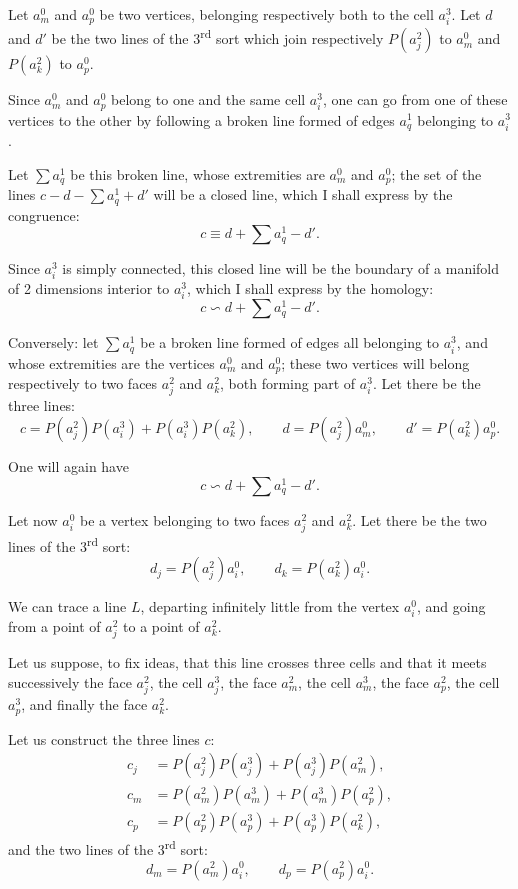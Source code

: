 \documentclass{article}
\begin{document}
Let $a^{0}_{m}$ and $a^{0}_{p}$ be two vertices, belonging respectively both to the cell $a^{3}_{i}$. Let $d$ and $d'$ be the two lines of the 3\textsuperscript{rd} sort which join respectively $P(a^{2}_{j})$ to $a^{0}_{m}$ and $P(a^{2}_{k})$ to $a^{0}_{p}$.

Since $a^{0}_{m}$ and $a^{0}_{p}$ belong to one and the same cell $a^{3}_{i}$, one can go from one of these vertices to the other by following a broken line formed of edges $a^{1}_{q}$ belonging to $a^{3}_{i}$.


Let $\displaystyle\sum a^{1}_{q}$ be this broken line, whose extremities are $a^{0}_{m}$ and $a^{0}_{p}$; the set of the lines $c - d - \displaystyle\sum a^{1}_{q} + d'$ will be a closed line, which I shall express by the congruence:
\[ c \equiv d + \sum a^{1}_{q} - d'. \]

Since $a^{3}_{i}$ is simply connected, this closed line will be the boundary of a manifold of 2 dimensions interior to $a^{3}_{i}$, which I shall express by the homology:
\[ c \backsim d + \sum a^{1}_{q} - d'. \]

Conversely: let $\displaystyle\sum a^{1}_{q}$ be a broken line formed of edges all belonging to $a^{3}_{i}$, and whose extremities are the vertices $a^{0}_{m}$ and $a^{0}_{p}$; these two vertices will belong respectively to two faces $a^{2}_{j}$ and $a^{2}_{k}$, both forming part of $a^{3}_{i}$. Let there be the three lines:
\[ c = P(a^{2}_{j}) P(a^{3}_{i}) + P(a^{3}_{i}) P(a^{2}_{k}), \qquad d = P(a^{2}_{j}) a^{0}_{m}, \qquad d' = P(a^{2}_{k}) a^{0}_{p}. \]

One will again have
\[ c \backsim d + \sum a^{1}_{q} - d'. \]

Let now $a^{0}_{i}$ be a vertex belonging to two faces $a^{2}_{j}$ and $a^{2}_{k}$. Let there be the two lines of the 3\textsuperscript{rd} sort:
\[ d_{j} = P(a^{2}_{j}) a^{0}_{i}, \qquad d_{k} = P(a^{2}_{k}) a^{0}_{i}. \]

We can trace a line $L$, departing infinitely little from the vertex $a^{0}_{i}$, and going from a point of $a^{2}_{j}$ to a point of $a^{2}_{k}$.

Let us suppose, to fix ideas, that this line crosses three cells and that it meets successively the face $a^{2}_{j}$, the cell $a^{3}_{j}$, the face $a^{2}_{m}$, the cell $a^{3}_{m}$, the face $a^{2}_{p}$, the cell $a^{3}_{p}$, and finally the face $a^{2}_{k}$.

Let us construct the three lines $c$:
\[ \begin{aligned} c_{j} &= P(a^{2}_{j}) P(a^{3}_{j}) + P(a^{3}_{j}) P(a^{2}_{m}), \\ c_{m} &= P(a^{2}_{m}) P(a^{3}_{m}) + P(a^{3}_{m}) P(a^{2}_{p}), \\ c_{p} &= P(a^{2}_{p}) P(a^{3}_{p}) + P(a^{3}_{p}) P(a^{2}_{k}), \end{aligned} \]
and the two lines of the 3\textsuperscript{rd} sort:
\[ d_{m} = P(a^{2}_{m}) a^{0}_{i}, \qquad d_{p} = P(a^{2}_{p}) a^{0}_{i}. \]
\end{document}
